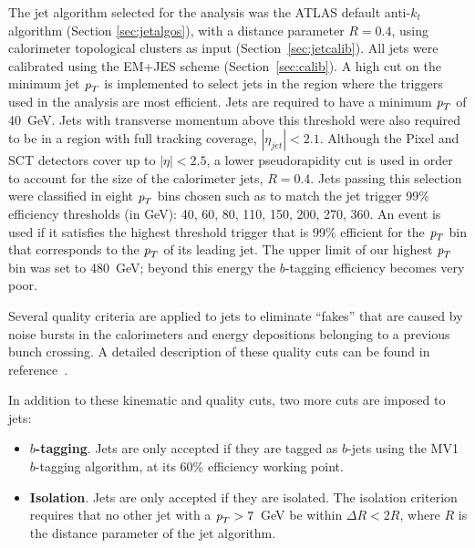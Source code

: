 The jet algorithm selected for the analysis was the ATLAS default anti-$k_t$ algorithm (Section \ref{sec:jetalgos}), with a distance parameter $R = 0.4$, using calorimeter topological clusters as input (Section~\ref{sec:jetcalib}). All jets were calibrated using the EM+JES scheme (Section~\ref{sec:calib}).
A high cut on the minimum jet ${\emph{p}_{T}}$ is implemented to select jets in the region where the triggers used in the analysis are most efficient. Jets are required to have a minimum ${\emph{p}_{T}}$ of 40~GeV.  Jets with transverse momentum above this threshold were also required to be in a region with full tracking coverage, $|\eta_{jet}|< 2.1$. Although the Pixel and SCT detectors cover up to $|\eta|<2.5$, a lower pseudorapidity cut is used in order to account for the size of the calorimeter jets, $R=0.4$.  Jets passing this selection were classified in eight ${\emph{p}_{T}}$ bins chosen such as to match the jet trigger 99\% efficiency thresholds (in GeV): 40, 60, 80, 110, 150, 200, 270, 360. An event is used if it satisfies the highest threshold trigger that is 99\% efficient for the ${\emph{p}_{T}}$ bin that corresponds to the ${\emph{p}_{T}}$ of its leading jet. The upper limit of our highest ${\emph{p}_{T}}$ bin was set to 480~GeV; beyond this energy the $b$-tagging efficiency becomes very poor.

Several quality criteria are applied to jets to eliminate ``fakes'' that are caused by noise bursts in the calorimeters and energy depositions belonging to a previous bunch crossing. A detailed description of these quality cuts can be found in reference~\cite{ATLAS-CONF-2012-020}.

In addition to these kinematic and quality cuts, two more cuts are imposed to jets:

\begin{itemize}
\item
\textbf{$b$-tagging}. Jets are only accepted if they are tagged as $b$-jets using the MV1 $b$-tagging algorithm, at its 60\% efficiency working point.
\item
\textbf{Isolation}. Jets are only accepted if they are isolated. The isolation criterion requires that no other jet with a ${\emph{p}_{T}} > 7$~GeV be within $\Delta R < 2R$, where $R$ is the distance parameter of the jet algorithm.
\end{itemize}

